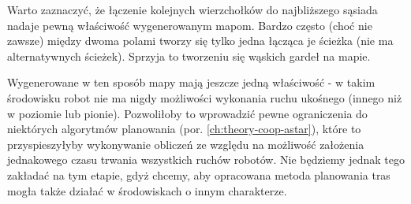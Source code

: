 Warto zaznaczyć, że łączenie kolejnych wierzchołków do najbliższego sąsiada nadaje pewną właściwość wygenerowanym mapom.
Bardzo często (choć nie zawsze) między dwoma polami tworzy się tylko jedna łącząca je ścieżka (nie ma alternatywnych ścieżek). Sprzyja to tworzeniu się wąskich gardeł na mapie.

Wygenerowane w ten sposób mapy mają jeszcze jedną właściwość - w takim środowisku robot nie ma nigdy możliwości wykonania ruchu ukośnego (innego niż w poziomie lub pionie). Pozwoliłoby to wprowadzić pewne ograniczenia do niektórych algorytmów planowania (por. \ref{ch:theory-coop-astar}), które to przyspieszyłyby wykonywanie obliczeń ze względu na możliwość założenia jednakowego czasu trwania wszystkich ruchów robotów. Nie będziemy jednak tego zakładać na tym etapie, gdyż chcemy, aby opracowana metoda planowania tras mogła także działać w środowiskach o innym charakterze.

